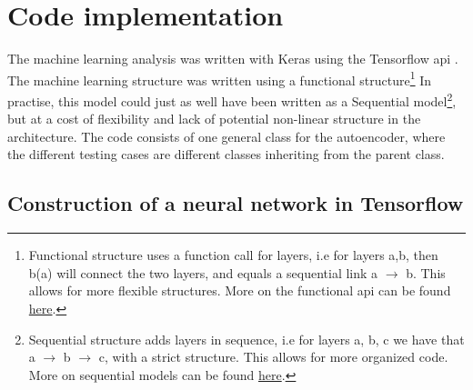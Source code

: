 \section*{Code implementation}

The machine learning analysis was written with Keras\cite{chollet2015keras} using the Tensorflow api\cite{tensorflow2015-whitepaper} . 
The machine learning structure was written using a functional structure\footnote{Functional structure uses a function call for layers, i.e for layers a,b, then b(a) will connect the two layers, and equals a sequential link a $\to$ b. This allows for more flexible structures. More on the functional api can be found \href{https://www.tensorflow.org/guide/keras/functional}{here}.}
In practise, this model could just as well have been written as a Sequential model\footnote{Sequential structure adds layers in sequence, i.e for layers a, b, c we have that a $\to$ b $\to$ c, with a strict structure. This allows for more organized code. More on sequential models can be found \href{https://www.tensorflow.org/guide/keras/sequential_model}{here}.}, 
but at a cost of flexibility and lack of potential non-linear structure in the architecture. The code consists of one general class for
 the autoencoder, where the different testing cases are different classes inheriting from the parent class.\par




\subsection*{Construction of a neural network in Tensorflow}

